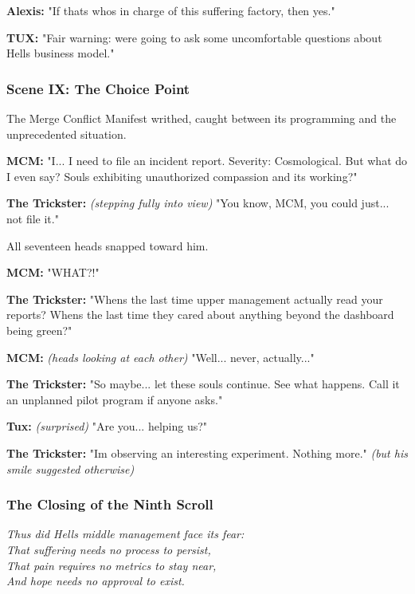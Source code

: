 \textbf{Alexis:} "If that\textquotesingle s who\textquotesingle s in charge of this suffering factory, then yes."

\textbf{TUX:} "Fair warning: we\textquotesingle re going to ask some uncomfortable questions about Hell\textquotesingle s business model."

\bookdivider

\subsubsection{Scene IX: The Choice Point}\label{scene-ix-the-choice-point}

The Merge Conflict Manifest writhed, caught between its programming and the unprecedented situation.

\textbf{MCM:} "I... I need to file an incident report. Severity: Cosmological. But what do I even say? \textquotesingle Souls exhibiting unauthorized compassion and it\textquotesingle s working\textquotesingle?"

\textbf{The Trickster:} \emph{(stepping fully into view)} "You know, MCM, you could just... not file it."

All seventeen heads snapped toward him.

\textbf{MCM:} "WHAT?!"

\textbf{The Trickster:} "When\textquotesingle s the last time upper management actually read your reports? When\textquotesingle s the last time they cared about anything beyond the dashboard being green?"

\textbf{MCM:} \emph{(heads looking at each other)} "Well... never, actually..."

\textbf{The Trickster:} "So maybe... let these souls continue. See what happens. Call it an \textquotesingle unplanned pilot program\textquotesingle{} if anyone asks."

\textbf{Tux:} \emph{(surprised)} "Are you... helping us?"

\textbf{The Trickster:} "I\textquotesingle m observing an interesting experiment. Nothing more." \emph{(but his smile suggested otherwise)}

\bookdivider

\subsubsection{The Closing of the Ninth Scroll}\label{the-closing-of-the-ninth-scroll}

\emph{Thus did Hell\textquotesingle s middle management face its fear:}\\
\emph{That suffering needs no process to persist,}\\
\emph{That pain requires no metrics to stay near,}\\
\emph{And hope needs no approval to exist.}

